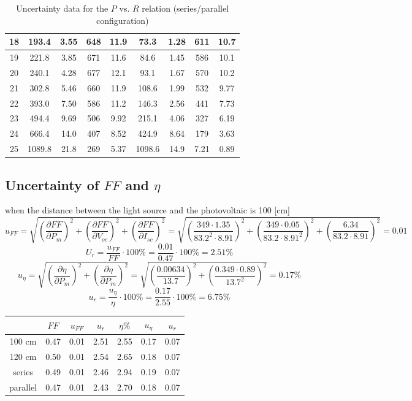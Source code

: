 \documentclass[12pt]{article}
\begin{document}
\begin{table}[H]
\begin{tabular}{|c|c|c|c|c|c|c|c|c|}
18 & 193.4    & 3.55      & 648  &11.9    & 73.3     & 1.28     & 611   &10.7   \\ \hline
19 & 221.8    & 3.85      & 671  &11.6    & 84.6     & 1.45     & 586   &10.1   \\ \hline
20 & 240.1    & 4.28      & 677  &12.1    & 93.1     & 1.67     & 570   &10.2   \\ \hline
21 & 302.8    & 5.46      & 660  &11.9    & 108.6    & 1.99     & 532   &9.77   \\ \hline
22 & 393.0    & 7.50      & 586  &11.2    & 146.3    & 2.56     & 441   &7.73   \\ \hline
23 & 494.4    & 9.69      & 506  &9.92    & 215.1    & 4.06     & 327   &6.19   \\ \hline
24 & 666.4    & 14.0      & 407  &8.52    & 424.9    & 8.64     & 179   &3.63   \\ \hline
25 & 1089.8   & 21.8      & 269  &5.37    & 1098.6   & 14.9     & 7.21  &0.89   \\ \hline
\end{tabular}
\caption{Uncertainty data for the $P$ vs. $R$ relation (series/parallel configuration)}
\end{table}
\subsection{Uncertainty of $FF$ and $\eta$}
when the distance between the light source and the photovoltaic is 100 [cm]
$$u_{FF}=\sqrt{(\frac{\partial FF}{\partial P_m})^2+(\frac{\partial FF}{\partial V_{oc}})^2+(\frac{\partial FF}{\partial I_{sc}})^2}=\sqrt{(\frac{349\cdot1.35}{83.2^2\cdot8.91})^2+(\frac{349\cdot0.05}{83.2\cdot8.91^2})^2+(\frac{6.34}{83.2\cdot8.91})^2}=0.01$$
$$U_r=\frac{u_{FF}}{FF}\cdot100\%=\frac{0.01}{0.47}\cdot100\%=2.51\%$$
$$u_\eta=\sqrt{(\frac{\partial\eta}{\partial P_m})^2+(\frac{\partial\eta}{\partial P_{in}})^2}=\sqrt{(\frac{0.00634}{13.7})^2+(\frac{0.349\cdot0.89}{13.7^2})^2}=0.17\%$$
$$u_r=\frac{u_\eta}{\eta}\cdot100\%=\frac{0.17}{2.55}\cdot100\%=6.75\%$$
\begin{table}[H]
\centering
\begin{tabular}{|c|c|c|c|c|c|c|}
\hline
         & $FF$     & $u_{FF}$     & $u_r$      &  $\eta\%$    &  $u_{\eta}$    & $u_r$ \\ \hline
100 cm   & 0.47 & 0.01 & 2.51  & 2.55 & 0.17 &0.07  \\ \hline
120 cm   & 0.50 & 0.01 & 2.54  & 2.65 & 0.18 &0.07  \\ \hline
series   & 0.49 & 0.01 & 2.46  & 2.94 & 0.19 &0.07  \\ \hline
parallel & 0.47 & 0.01 & 2.43  & 2.70 & 0.18 &0.07  \\ \hline
\end{tabular}
\end{table}
\end{document}

